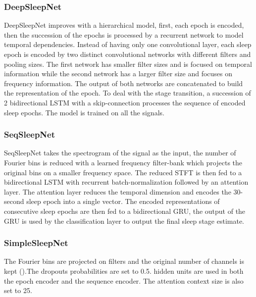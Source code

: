 \documentclass[journal]{IEEEtran}
\begin{document}
\subsubsection{DeepSleepNet \cite{Supratak2017}}
DeepSleepNet improves  \cite{Tsinalis2016a} with a hierarchical model, first, each epoch is encoded, then the succession of the epochs is processed by a recurrent network to model temporal dependencies.
Instead of having only one convolutional layer, each sleep  epoch is encoded by two distinct convolutional networks with different filters and pooling sizes. The first network has smaller filter sizes and is focused on temporal information while the second network has a larger filter size and focuses on frequency information. The output of both networks are concatenated to build the representation of the epoch. To deal with the stage transition, a succession of 2 bidirectional LSTM with a skip-connection processes the sequence of encoded sleep epochs. The model is trained on all the signals.

\subsubsection{SeqSleepNet \cite{Phan2019}}
 SeqSleepNet takes the spectrogram of the signal as the input, the number of Fourier bins is reduced with a learned frequency filter-bank which projects the original bins on a smaller frequency space. The reduced STFT is then fed to a bidirectional LSTM with recurrent batch-normalization \cite{cooijmans2016recurrent} followed by an attention layer. The attention layer reduces the temporal dimension and encodes the 30-second sleep epoch into a single vector. The encoded representations of consecutive sleep epochs are then fed to a bidirectional GRU, the output of the GRU is used by the classification layer to output the final sleep stage estimate.

\subsubsection{SimpleSleepNet}
The Fourier bins are projected on  filters and the original number of channels is kept ().The dropouts probabilities  are set to 0.5.  hidden units are used in both the epoch encoder and the sequence encoder. The attention context size  is also set to 25.
\end{document}
